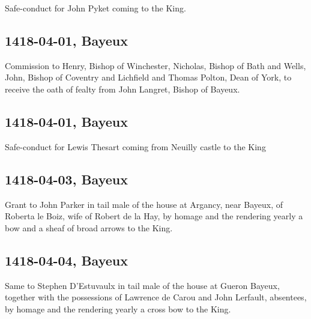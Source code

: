 \documentclass[a4paper,12pt,twoside]{book}
\begin{document}
                
                  Safe-conduct for John Pyket coming to the King.
               
                
                \subsection{1418-04-01, Bayeux}
                
                
                  Commission to Henry, Bishop of Winchester, Nicholas, Bishop of Bath and Wells, John, Bishop of Coventry and Lichfield and Thomas Polton, Dean of York, to receive the oath of fealty from John Langret, Bishop of Bayeux.
               
                
                \subsection{1418-04-01, Bayeux}
                
                
                  Safe-conduct for Lewis Thesart coming from Neuilly castle to the King
               
                
                \subsection{1418-04-03, Bayeux}
                
                
                  Grant to John Parker in tail male of the house at Argancy, near Bayeux, of Roberta le Boiz, wife of Robert de la Hay, by homage and the rendering yearly a bow and a sheaf of broad arrows to the King.
               
                
                \subsection{1418-04-04, Bayeux}
                
                
                  Same to Stephen D’Estuvaulx in tail male of the house at Gueron Bayeux, together with the possessions of Lawrence de Carou and John Lerfault, absentees, by homage and the rendering yearly a cross bow to the King.
               
\end{document}
